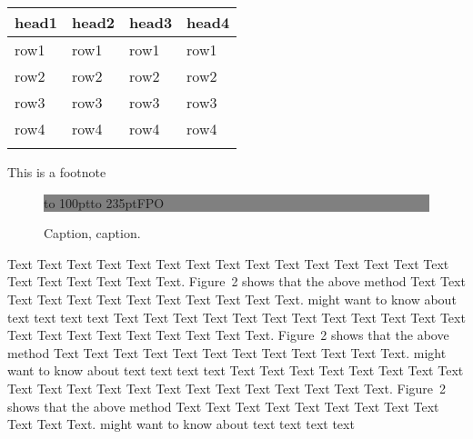 \documentclass{bioinfo}
\begin{document}
\begin{methods}
        \begin{table}[!t]
             {\begin{tabular}{@{}llll@{}}
                                                                    \toprule head1 &
                                                                    head2 & head3 & head4 \\\midrule
                                                                    row1 & row1 & row1 & row1 \\
                                                                    row2 & row2 & row2 & row2 \\
                                                                    row3 & row3 & row3 & row3 \\
                                                                    row4 & row4 & row4 & row4 \\\botrule
            \end{tabular}}{This is a footnote}
        \end{table}

    \end{methods}

    \begin{figure}[!tpb]%
        \fboxsep=0pt\colorbox{gray}{\begin{minipage}[t]{235pt}
                                        \vbox to 100pt{\vfill\hbox to
                                        235pt{\hfill\fontsize{24pt}{24pt}\selectfont FPO\hfill}\vfill}
        \end{minipage}}
        \caption{Caption, caption.}\label{fig:01}
    \end{figure}


    Text Text Text Text Text Text Text Text Text Text Text Text Text
    Text Text Text Text Text Text Text Text.
    Figure~2\vphantom{\ref{fig:02}} shows that the above method Text
    Text Text Text Text Text Text Text Text Text Text Text.
    \citealp{Boffelli03} might want to know about text text text text
    Text Text Text Text Text Text Text Text Text Text Text Text Text
    Text Text Text Text Text Text Text Text.
    Figure~2\vphantom{\ref{fig:02}} shows that the above method Text
    Text Text Text Text Text Text Text Text Text Text Text.
    \citealp{Boffelli03} might want to know about text text text text
    Text Text Text Text Text Text Text Text Text Text Text Text Text
    Text Text Text Text Text Text Text Text.
    Figure~2\vphantom{\ref{fig:02}} shows that the above method Text
    Text Text Text Text Text Text Text Text Text Text Text.
    \citealp{Boffelli03} might want to know about text text text text
\end{document}
